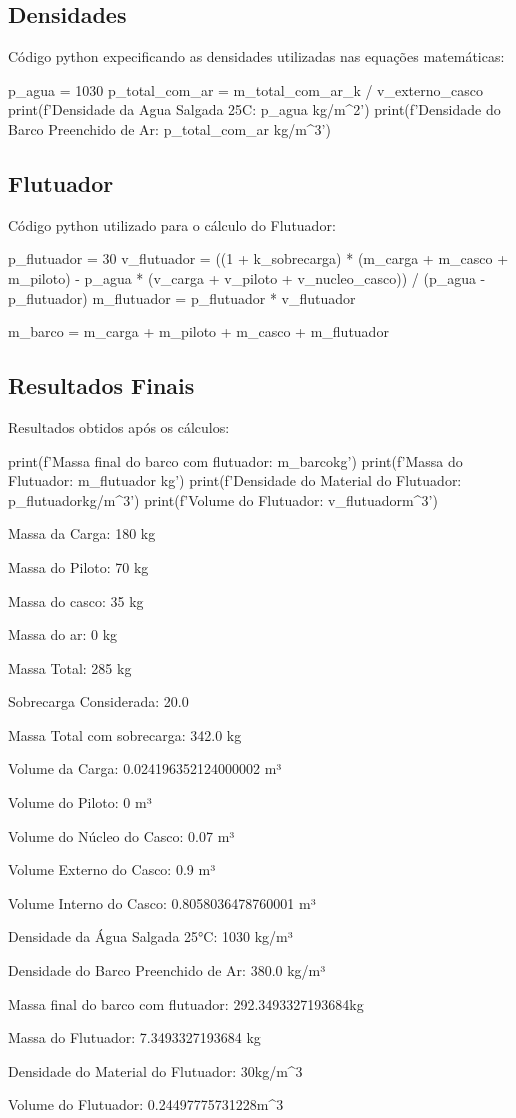 \documentclass[a4paper]{article}
\begin{document}
\subsection{Densidades}
Código python expecificando as densidades utilizadas nas equações matemáticas:
\begin{python}
p_agua = 1030
p_total_com_ar = m_total_com_ar_k / v_externo_casco
print(f'Densidade da Agua Salgada 25C: {p_agua} kg/m^2')
print(f'Densidade do Barco Preenchido de Ar: {p_total_com_ar} kg/m^3\n')
\end{python}

\subsection{Flutuador}
Código python utilizado para o cálculo do Flutuador:
\begin{python}
p_flutuador = 30
v_flutuador = ((1 + k_sobrecarga) * (m_carga + m_casco + m_piloto) - p_agua * (v_carga + v_piloto + v_nucleo_casco)) / (p_agua - p_flutuador)
m_flutuador = p_flutuador * v_flutuador

m_barco = m_carga + m_piloto + m_casco + m_flutuador
\end{python}

\subsection{Resultados Finais}
Resultados obtidos após os cálculos:
\begin{python}
print(f'Massa final do barco com flutuador: {m_barco}kg')
print(f'Massa do Flutuador: {m_flutuador} kg')
print(f'Densidade do Material do Flutuador: {p_flutuador}kg/m^3')
print(f'Volume do Flutuador: {v_flutuador}m^3\n')
\end{python}

Massa da Carga: 180 kg

Massa do Piloto: 70 kg

Massa do casco: 35 kg

Massa do ar: 0 kg

Massa Total: 285 kg

Sobrecarga Considerada: 20.0 %

Massa Total com sobrecarga: 342.0 kg


Volume da Carga: 0.024196352124000002 m³

Volume do Piloto: 0 m³

Volume do Núcleo do Casco: 0.07 m³

Volume Externo do Casco: 0.9 m³

Volume Interno do Casco: 0.8058036478760001 m³


Densidade da Água Salgada 25°C: 1030 kg/m³

Densidade do Barco Preenchido de Ar: 380.0 kg/m³


Massa final do barco com flutuador: 292.3493327193684kg

Massa do Flutuador: 7.3493327193684 kg

Densidade do Material do Flutuador: 30kg/m^3

Volume do Flutuador: 0.24497775731228m^3
\end{document}
